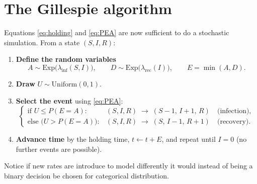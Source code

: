 \section{The Gillespie algorithm}

Equations \eqref{eq:holding} and \eqref{eq:PEA} are now sufficient to do a stochastic
simulation. From a state $(S,I,R)$:

\begin{enumerate}
  \item \textbf{Define the random variables}
        \[
          A \sim \mathrm{Exp}\!\big(\lambda_{\mathrm{inf}}(S,I)\big),\qquad
          D \sim \mathrm{Exp}\!\big(\lambda_{\mathrm{rec}}(I)\big),\qquad
          E = \min(A,D).
        \]
  \item \textbf{Draw} $U \sim \mathrm{Uniform}(0,1)$.
  \item \textbf{Select the event} using \eqref{eq:PEA}:
        \[
          \begin{cases}
            \text{if } U \le P(E=A): &
              (S,I,R)\;\longrightarrow\;(S-1,\,I+1,\,R)
              \quad\text{(infection)},\\[4pt]
            \text{else } \big(U > P(E=A)\big): &
              (S,I,R)\;\longrightarrow\;(S,\,I-1,\,R+1)
              \quad\text{(recovery)}.
          \end{cases}
        \]
  \item \textbf{Advance time} by the holding time, $t \leftarrow t + E$, and
        repeat until $I=0$ (no further events are possible).
\end{enumerate}

Notice if new rates are introduce to model differently it would instead of being a binary decision be chosen for categorical distribution. 